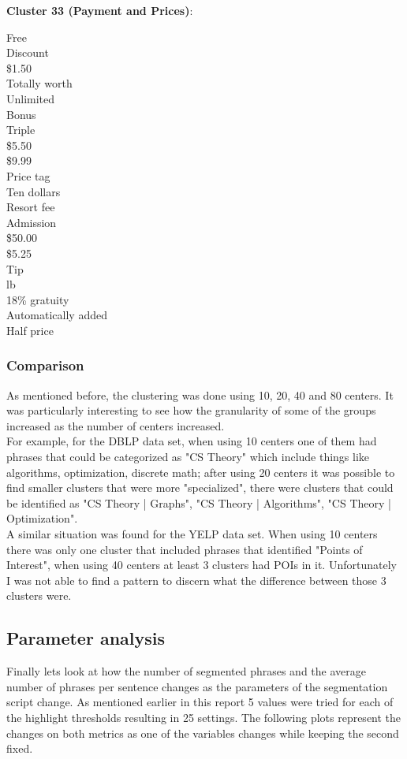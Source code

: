 \documentclass[11pt]{article}
\begin{document}
\textbf{Cluster 33 (Payment and Prices)}:
\begin{multicols}{3}
Free\\
Discount\\
\$1.50\\
Totally worth\\
Unlimited\\
Bonus\\
Triple\\
\$5.50\\
\$9.99\\
Price tag\\
Ten dollars\\
Resort fee\\
Admission\\
\$50.00\\
\$5.25\\
Tip\\
lb\\
18\% gratuity\\
Automatically added\\
Half price
\end{multicols}

\subsubsection*{Comparison}
As mentioned before, the clustering was done using 10, 20, 40 and 80 centers. It was particularly interesting to see how the granularity of some of the groups increased as the number of centers increased.\\

For example, for the DBLP data set, when using 10 centers one of them had phrases that could be categorized as "CS Theory" which include things like algorithms, optimization, discrete math; after using 20 centers it was possible to find smaller clusters that were more "specialized", there were clusters that could be identified as "CS Theory | Graphs", "CS Theory | Algorithms", "CS Theory | Optimization". \\

A similar situation was found for the YELP data set. When using 10 centers there was only one cluster that included phrases that identified "Points of Interest", when using 40 centers at least 3 clusters had POIs in it. Unfortunately I was not able to find a pattern to discern what the difference between those 3 clusters were.\\

\subsection*{Parameter analysis}
Finally lets look at how the number of segmented phrases and the average number of phrases per sentence changes as the parameters of the segmentation script change. As mentioned earlier in this report 5 values were tried for each of the highlight thresholds resulting in 25 settings. The following plots represent the changes on both metrics as one of the variables changes while keeping the second fixed.
\end{document}
